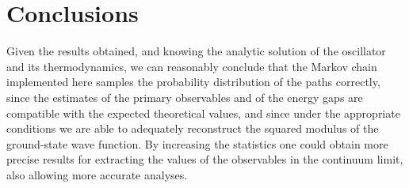 \documentclass[10pt,a4paper]{article}
\begin{document}
\section{Conclusions}

Given the results obtained, and knowing the analytic solution of the oscillator and
its thermodynamics, we can reasonably conclude that the Markov chain implemented
here samples the probability distribution of the paths correctly, since the
estimates of the primary observables and of the energy gaps are compatible with the
expected theoretical values, and since under the appropriate conditions we are able
to adequately reconstruct the squared modulus of the ground-state wave function.
By increasing the statistics one could obtain more precise results for extracting
the values of the observables in the continuum limit, also allowing more accurate
analyses.
\end{document}
